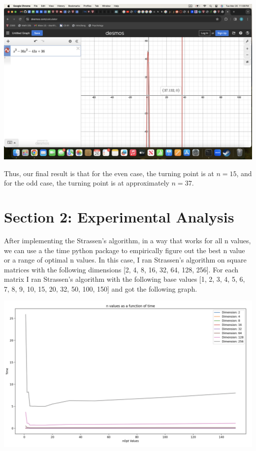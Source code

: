 \documentclass{article}
\begin{document}
\includegraphics[width=\linewidth]{StrassenPlot.png}

Thus, our final result is that for the even case, the turning point is at $n=15$, and for the odd case, the turning point is at approximately $n=37$.

\pagebreak

\section{Section 2: Experimental Analysis}
After implementing the Strassen's algorithm, in a way that works for all n values, we can use a the time python package to empirically figure out the best n value or a range of optimal n values. In this case, I ran Strassen's algorithm on square matrices with the following dimensions [2, 4, 8, 16, 32, 64, 128, 256]. For each matrix I ran Strassen's algorithm with the following base values [1, 2, 3, 4, 5, 6, 7, 8, 9, 10, 15, 20, 32, 50, 100, 150] and got the following graph.

\includegraphics[width=\textwidth]{graph.png} \\
\end{document}
